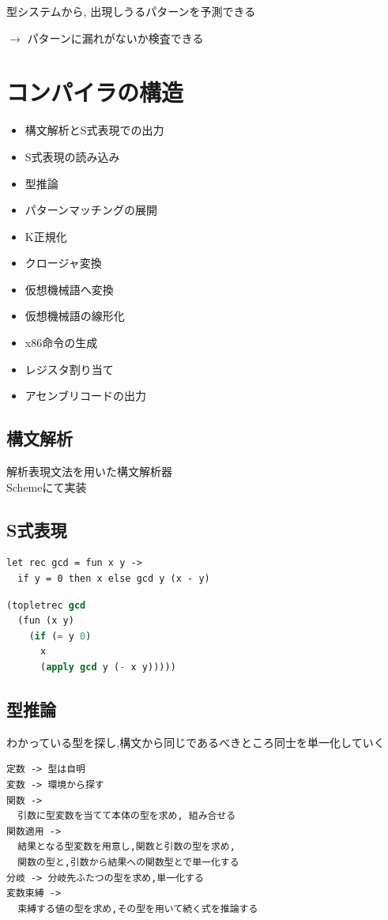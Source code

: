 \documentclass[papersize,30pt,slide]{jsarticle}
\begin{document}
型システムから, 出現しうるパターンを予測できる 

\hspace{1em} $\rightarrow$ パターンに漏れがないか検査できる


\section{コンパイラの構造}

\begin{itemize}
\item 構文解析とS式表現での出力 
\item S式表現の読み込み
\item 型推論
\item パターンマッチングの展開
\item K正規化
\item クロージャ変換
\item 仮想機械語へ変換
\item 仮想機械語の線形化
\item x86命令の生成
\item レジスタ割り当て
\item アセンブリコードの出力
\end{itemize}

\newpage

\subsection{構文解析}
解析表現文法を用いた構文解析器 \\
Schemeにて実装


\subsection{S式表現}
\begin{lstlisting}
let rec gcd = fun x y ->
  if y = 0 then x else gcd y (x - y)
\end{lstlisting}

\begin{lstlisting}[language=Lisp,columns=fullflexible,morekeywords={topletrec,fun,if},deletekeywords={gcd}]
(topletrec gcd
  (fun (x y)
    (if (= y 0)
      x
      (apply gcd y (- x y)))))
\end{lstlisting}

\newpage
\subsection{型推論}
わかっている型を探し,構文から同じであるべきところ同士を単一化していく
\begin{lstlisting}
定数 -> 型は自明
変数 -> 環境から探す
関数 ->
  引数に型変数を当てて本体の型を求め, 組み合せる
関数適用 ->
  結果となる型変数を用意し,関数と引数の型を求め,
  関数の型と,引数から結果への関数型とで単一化する
分岐 -> 分岐先ふたつの型を求め,単一化する
変数束縛 ->
  束縛する値の型を求め,その型を用いて続く式を推論する
\end{lstlisting}
\end{document}
